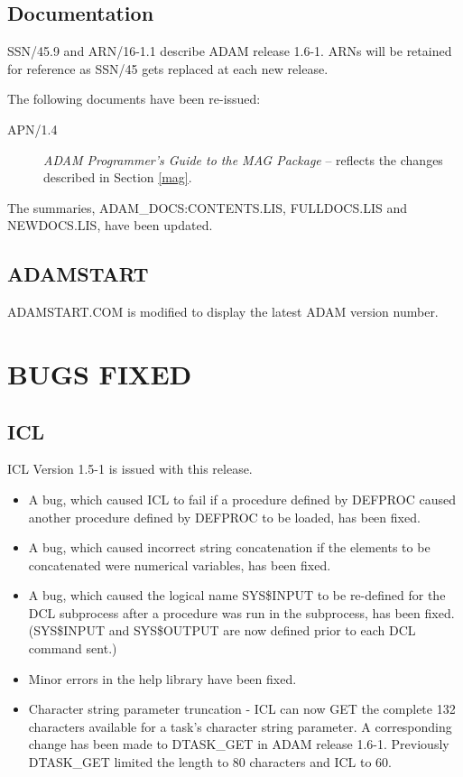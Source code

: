 \subsection{Documentation}
SSN/45.9 and ARN/16-1.1 describe ADAM release 1.6-1.
ARNs will be retained for reference as SSN/45 gets replaced at each new release.

The following documents have been re-issued:

\begin{description}
\item[APN/1.4] {\it ADAM Programmer's Guide to the MAG Package} -- reflects
the changes described in Section \ref{mag}.
\end{description}

The summaries, ADAM\_DOCS:CONTENTS.LIS, FULLDOCS.LIS and NEWDOCS.LIS, have been
updated.

\subsection{ADAMSTART}
ADAMSTART.COM is modified to display the latest ADAM version number.

\section{BUGS FIXED}
\subsection{ICL}
ICL Version 1.5-1 is issued with this release.
\begin{itemize}
\item A bug, which caused ICL to fail if a procedure defined by DEFPROC caused
another procedure defined by DEFPROC to be loaded, has been fixed.

\item A bug, which caused incorrect string concatenation if the elements to be
concatenated were numerical variables, has been fixed.

\item A bug, which caused the logical name SYS\$INPUT to be re-defined for the
DCL subprocess after a procedure was run in the subprocess, has been fixed.
(SYS\$INPUT and SYS\$OUTPUT are now defined prior to each DCL command sent.)

\item Minor errors in the help library have been fixed.

\item Character string parameter truncation -
ICL can now GET the complete 132 characters available
for a task's character string parameter. A corresponding change has been
made to DTASK\_GET in ADAM release 1.6-1.
Previously DTASK\_GET limited the length to 80 characters and ICL to 60.
\end{itemize}

